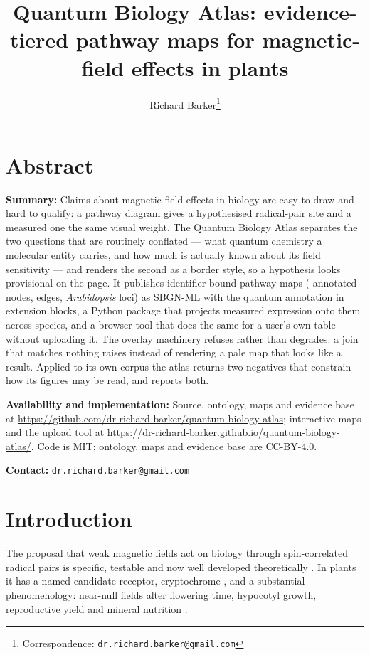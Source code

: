 \documentclass[11pt,a4paper]{article}
\title{\vspace{-1.2cm}\textbf{Quantum Biology Atlas: evidence-tiered pathway maps for
magnetic-field effects in plants}}
\author{Richard Barker\thanks{Correspondence: \texttt{dr.richard.barker@gmail.com}}}
\date{}
\newcommand{\repourl}{https://github.com/dr-richard-barker/quantum-biology-atlas}
\newcommand{\pagesurl}{https://dr-richard-barker.github.io/quantum-biology-atlas/}
\begin{document}
\maketitle
\vspace{-0.8cm}

\section*{Abstract}
\noindent\textbf{Summary:} Claims about magnetic-field effects in biology are easy to
draw and hard to qualify: a pathway diagram gives a hypothesised radical-pair site and a
measured one the same visual weight. The Quantum Biology Atlas separates the two
questions that are routinely conflated --- what quantum chemistry a molecular entity
carries, and how much is actually known about its field sensitivity --- and renders the
second as a border style, so a hypothesis looks provisional on the page. It publishes
\NMaps{} identifier-bound pathway maps (\NNodes{} annotated nodes, \NEdges{} edges,
\NLoci{} \emph{Arabidopsis} loci) as SBGN-ML \citep{LeNovere2009} with the quantum
annotation in extension blocks, a Python package that projects measured expression onto
them across \NSpecies{} species, and a browser tool that does the same for a user's own
table without uploading it. The overlay machinery refuses rather than degrades: a join
that matches nothing raises instead of rendering a pale map that looks like a result.
Applied to its own corpus the atlas returns two negatives that constrain how its figures
may be read, and reports both.

\smallskip
\noindent\textbf{Availability and implementation:} Source, ontology, maps and evidence
base at \url{\repourl}; interactive maps and the upload tool at \url{\pagesurl}. Code is
MIT; ontology, maps and evidence base are CC-BY-4.0.

\smallskip
\noindent\textbf{Contact:} \texttt{dr.richard.barker@gmail.com}

\section{Introduction}

The proposal that weak magnetic fields act on biology through spin-correlated radical
pairs is specific, testable and now well developed theoretically
\citep{Ritz2000,ZadehHaghighi2022}. In plants it has a named candidate receptor,
cryptochrome \citep{Ahmad2007,Solovyov2007,Pooam2019,Thoradit2023}, and a substantial
phenomenology: near-null fields alter flowering time, hypocotyl growth, reproductive
yield and mineral nutrition \citep{Xu2012,Xu2013,Agliassa2018a,Narayana2018,Islam2020}.
\end{document}
